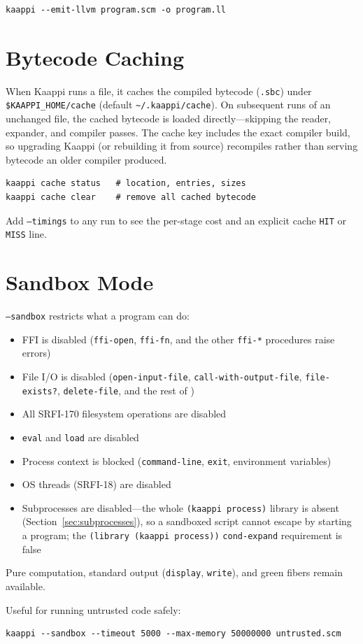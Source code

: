 \begin{Verbatim}[fontsize=\small]
kaappi --emit-llvm program.scm -o program.ll
\end{Verbatim}

\section{Bytecode Caching}

When Kaappi runs a file, it caches the compiled bytecode (\texttt{.sbc}) under \texttt{\$KAAPPI\_HOME/cache} (default \texttt{\textasciitilde/.kaappi/cache}). On subsequent runs of an unchanged file, the cached bytecode is loaded directly---skipping the reader, expander, and compiler passes. The cache key includes the exact compiler build, so upgrading Kaappi (or rebuilding it from source) recompiles rather than serving bytecode an older compiler produced.

\begin{Verbatim}[fontsize=\small]
kaappi cache status   # location, entries, sizes
kaappi cache clear    # remove all cached bytecode
\end{Verbatim}

Add \texttt{--timings} to any run to see the per-stage cost and an explicit cache \texttt{HIT} or \texttt{MISS} line.

\section{Sandbox Mode}
\label{sec:sandbox-mode}

\texttt{--sandbox} restricts what a program can do:

\begin{itemize}
    \item FFI is disabled (\texttt{ffi-open},
    \texttt{ffi-fn}, and the other \texttt{ffi-*} procedures
    raise errors)
    \item File I/O is disabled (\texttt{open-input-file},
    \texttt{call-with-output-file}, \texttt{file-exists?},
    \texttt{delete-file}, and the rest of )
    \item All SRFI-170 filesystem operations are disabled
    \item \texttt{eval} and \texttt{load} are disabled
    \item Process context is blocked
    (\texttt{command-line}, \texttt{exit},
    environment variables)
    \item OS threads (SRFI-18) are disabled
    \item Subprocesses are disabled---the whole \texttt{(kaappi process)} library is absent (Section~\ref{sec:subprocesses}), so a sandboxed script cannot escape by starting a program; the \texttt{(library (kaappi process))} \texttt{cond-expand} requirement is false
\end{itemize}

Pure computation, standard output (\texttt{display}, \texttt{write}), and green fibers remain available.

Useful for running untrusted code safely:

\begin{Verbatim}[fontsize=\small]
kaappi --sandbox --timeout 5000 --max-memory 50000000 untrusted.scm
\end{Verbatim}
